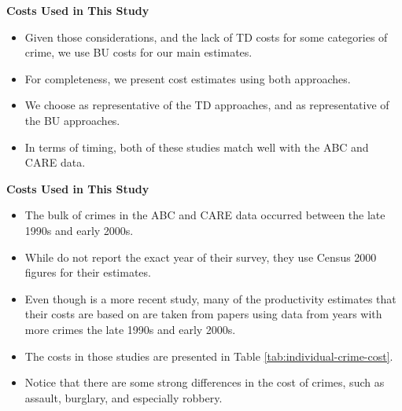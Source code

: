 \documentclass[static]{JJH-Beamer}
\begin{document}
\begin{frame}
 \addtocounter{framenumber}{-1}

\begin{center}
\textbf{Costs Used in This Study}
\end{center}
\begin{itemize}
\item Given those considerations, and the lack of TD costs for some categories of crime, we use BU costs for our main estimates.
\item For completeness, we present cost estimates using both approaches.
\item We choose \cite{Cohen_Rust_etal_2004_Criminology} as representative of the TD approaches, and \cite{McCollister_etal_2010_DAD} as representative of the BU approaches.
\item In terms of timing, both of these studies match well with the ABC and CARE data.
\end{itemize}

\end{frame}

\begin{frame}
 \addtocounter{framenumber}{-1}

\begin{center}
\textbf{Costs Used in This Study}
\end{center}
\begin{itemize}
\item The bulk of crimes in the ABC and CARE data occurred between the late 1990s and early 2000s.
\item While \cite{Cohen_Rust_etal_2004_Criminology} do not report the exact year of their survey, they use Census 2000 figures for their estimates.
\item Even though \cite{McCollister_etal_2010_DAD} is a more recent study, many of the productivity estimates that their costs are based on are taken from papers using data from years with more crimes the late 1990s and early 2000s.
\item The costs in those studies are presented in Table \ref{tab:individual-crime-cost}.
\item Notice that there are some strong differences in the cost of crimes, such as assault, burglary, and especially robbery.
\end{itemize}

\end{frame}
\end{document}
